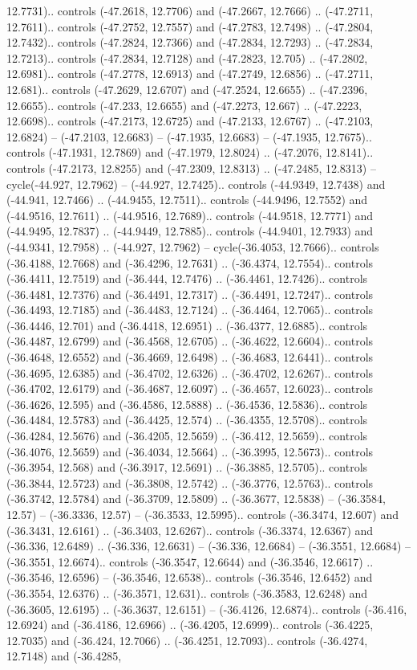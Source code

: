 \begin{scope}[shift={(2.5552, 9.9912)}]
\begin{scope}[shift={(48.1654, -14.8546)}]
12.7731).. controls (-47.2618, 12.7706) and (-47.2667, 12.7666) .. (-47.2711, 12.7611).. controls (-47.2752, 12.7557) and (-47.2783, 12.7498) .. (-47.2804, 12.7432).. controls (-47.2824, 12.7366) and (-47.2834, 12.7293) .. (-47.2834, 12.7213).. controls (-47.2834, 12.7128) and (-47.2823, 12.705) .. (-47.2802, 12.6981).. controls (-47.2778, 12.6913) and (-47.2749, 12.6856) .. (-47.2711, 12.681).. controls (-47.2629, 12.6707) and (-47.2524, 12.6655) .. (-47.2396, 12.6655).. controls (-47.233, 12.6655) and (-47.2273, 12.667) .. (-47.2223, 12.6698).. controls (-47.2173, 12.6725) and (-47.2133, 12.6767) .. (-47.2103, 12.6824) -- (-47.2103, 12.6683) -- (-47.1935, 12.6683) -- (-47.1935, 12.7675).. controls (-47.1931, 12.7869) and (-47.1979, 12.8024) .. (-47.2076, 12.8141).. controls (-47.2173, 12.8255) and (-47.2309, 12.8313) .. (-47.2485, 12.8313) -- cycle(-44.927, 12.7962) -- (-44.927, 12.7425).. controls (-44.9349, 12.7438) and (-44.941, 12.7466) .. (-44.9455, 12.7511).. controls (-44.9496, 12.7552) and (-44.9516, 12.7611) .. (-44.9516, 12.7689).. controls (-44.9518, 12.7771) and (-44.9495, 12.7837) .. (-44.9449, 12.7885).. controls (-44.9401, 12.7933) and (-44.9341, 12.7958) .. (-44.927, 12.7962) -- cycle(-36.4053, 12.7666).. controls (-36.4188, 12.7668) and (-36.4296, 12.7631) .. (-36.4374, 12.7554).. controls (-36.4411, 12.7519) and (-36.444, 12.7476) .. (-36.4461, 12.7426).. controls (-36.4481, 12.7376) and (-36.4491, 12.7317) .. (-36.4491, 12.7247).. controls (-36.4493, 12.7185) and (-36.4483, 12.7124) .. (-36.4464, 12.7065).. controls (-36.4446, 12.701) and (-36.4418, 12.6951) .. (-36.4377, 12.6885).. controls (-36.4487, 12.6799) and (-36.4568, 12.6705) .. (-36.4622, 12.6604).. controls (-36.4648, 12.6552) and (-36.4669, 12.6498) .. (-36.4683, 12.6441).. controls (-36.4695, 12.6385) and (-36.4702, 12.6326) .. (-36.4702, 12.6267).. controls (-36.4702, 12.6179) and (-36.4687, 12.6097) .. (-36.4657, 12.6023).. controls (-36.4626, 12.595) and (-36.4586, 12.5888) .. (-36.4536, 12.5836).. controls (-36.4484, 12.5783) and (-36.4425, 12.574) .. (-36.4355, 12.5708).. controls (-36.4284, 12.5676) and (-36.4205, 12.5659) .. (-36.412, 12.5659).. controls (-36.4076, 12.5659) and (-36.4034, 12.5664) .. (-36.3995, 12.5673).. controls (-36.3954, 12.568) and (-36.3917, 12.5691) .. (-36.3885, 12.5705).. controls (-36.3844, 12.5723) and (-36.3808, 12.5742) .. (-36.3776, 12.5763).. controls (-36.3742, 12.5784) and (-36.3709, 12.5809) .. (-36.3677, 12.5838) -- (-36.3584, 12.57) -- (-36.3336, 12.57) -- (-36.3533, 12.5995).. controls (-36.3474, 12.607) and (-36.3431, 12.6161) .. (-36.3403, 12.6267).. controls (-36.3374, 12.6367) and (-36.336, 12.6489) .. (-36.336, 12.6631) -- (-36.336, 12.6684) -- (-36.3551, 12.6684) -- (-36.3551, 12.6674).. controls (-36.3547, 12.6644) and (-36.3546, 12.6617) .. (-36.3546, 12.6596) -- (-36.3546, 12.6538).. controls (-36.3546, 12.6452) and (-36.3554, 12.6376) .. (-36.3571, 12.631).. controls (-36.3583, 12.6248) and (-36.3605, 12.6195) .. (-36.3637, 12.6151) -- (-36.4126, 12.6874).. controls (-36.416, 12.6924) and (-36.4186, 12.6966) .. (-36.4205, 12.6999).. controls (-36.4225, 12.7035) and (-36.424, 12.7066) .. (-36.4251, 12.7093).. controls (-36.4274, 12.7148) and (-36.4285, 
\end{scope}
\end{scope}
